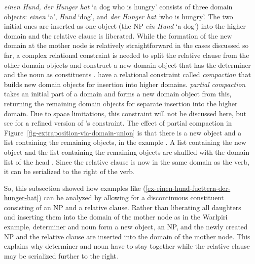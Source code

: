 \documentclass[output=paper
                ,modfonts
                ,nonflat
	        ,collection
	        ,collectionchapter
	        ,collectiontoclongg
 	        ,biblatex
                ,babelshorthands
                ,newtxmath
                ,draftmode
                ,colorlinks, citecolor=brown
]{./langsci/langscibook}
\begin{document}
\emph{einen Hund, der Hunger hat} `a dog who is hungry' consists of three domain objects:
\emph{einen} `a', \emph{Hund} `dog', and \emph{der Hunger hat} `who is hungry'. The two initial ones
are inserted as one object (the NP \emph{ein Hund} `a dog') into the higher domain
and the relative clause is liberated. While the formation of the new domain at the mother node is
relatively straightforward in the cases discussed so far, a complex relational constraint is needed
to split the relative clause  from the other domain objects and construct a new domain
object that has the determiner and the noun as constituents . \citeauthor{KP95a} have a relational constraint called
\textit{compaction} that builds new domain objects for insertion into higher
domains. \textit{partial compaction} takes an initial part of a domain and forms a new domain object
from this, returning the remaining domain objects for separate insertion into the higher domain. Due
to space limitations, this constraint will not be discussed here, but see  for a refined version of \citeauthor{KP95a}'s constraint. The effect of partial
compaction in Figure~\ref{fig-extraposition-via-domain-union} is that there is a new object 
and a list containing the remaining objects, in the example . A list containing
the new object  and the list containing the remaining objects  are
shuffled with the domain list of the head . Since the relative clause is now in the same domain
as the verb, it can be serialized to the right of the verb.

So, this subsection showed how examples like (\ref{ex-einen-hund-fuettern-der-hunger-hat}) can be
analyzed by allowing for a discontinuous constituent consisting of an NP and a relative
clause. Rather than liberating all daughters and inserting them into the domain of the mother node
as in the Warlpiri example, determiner and noun form a new object, an NP, and the newly created NP
and the relative clause are inserted into the domain of the mother node. This explains why
determiner and noun have to stay together while the relative clause may be serialized further to the right.

\end{document}
